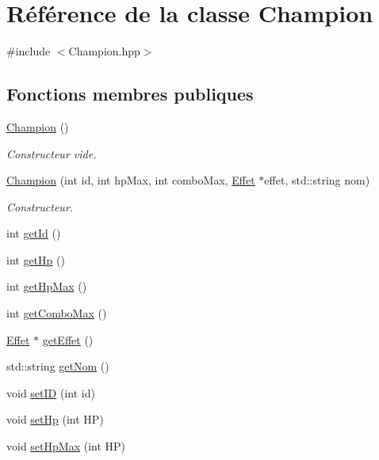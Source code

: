 \hypertarget{class_champion}{\section{Référence de la classe Champion}
\label{class_champion}
}


{\ttfamily \#include $<$Champion.\-hpp$>$}

\subsection*{Fonctions membres publiques}
\begin{DoxyCompactItemize}
\item 
\hyperlink{class_champion_ae95b91cab1878f14d2692507b27963dd}{Champion} ()
\begin{DoxyCompactList}\small\item\em Constructeur vide. \end{DoxyCompactList}\item 
\hyperlink{class_champion_aa5f98a45358bc35fefe11fd95331a72a}{Champion} (int id, int hp\-Max, int combo\-Max, \hyperlink{class_effet}{Effet} $\ast$effet, std\-::string nom)
\begin{DoxyCompactList}\small\item\em Constructeur. \end{DoxyCompactList}\item 
int \hyperlink{class_champion_a08af66438808b888a6a18ac0479bf8ec}{get\-Id} ()
\item 
int \hyperlink{class_champion_a7c714b2422172c3586162d906c9408a4}{get\-Hp} ()
\item 
int \hyperlink{class_champion_a9924480ad2ca158c837d2f6c93aed31a}{get\-Hp\-Max} ()
\item 
int \hyperlink{class_champion_aade05c286155a85bcf24c0d3cd14dce8}{get\-Combo\-Max} ()
\item 
\hyperlink{class_effet}{Effet} $\ast$ \hyperlink{class_champion_a95a19dc8dd87fd90422a55adb1e5a061}{get\-Effet} ()
\item 
std\-::string \hyperlink{class_champion_a923eb539fde9268b66b742fed8a89e2d}{get\-Nom} ()
\item 
void \hyperlink{class_champion_a0e0f7a973941033778e0022d7da51454}{set\-I\-D} (int id)
\item 
void \hyperlink{class_champion_ae3e1217d86f764db9793509c831af8d8}{set\-Hp} (int H\-P)
\item 
void \hyperlink{class_champion_ad6f8e1ab08c6e9e70b15375e9738ea95}{set\-Hp\-Max} (int H\-P)

\end{DoxyCompactItemize}
